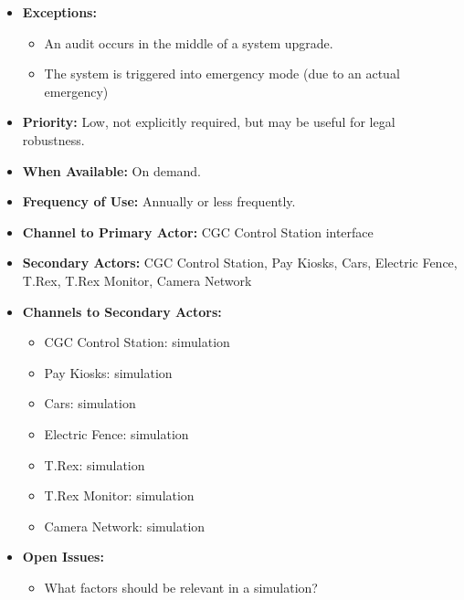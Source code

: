 \documentclass[12pt]{article}
\begin{document}
\begin{itemize}
        \item[]\textbf{Exceptions:}
            \begin{itemize}
                \item[] An audit occurs in the middle of a system upgrade.
                \item[] The system is triggered into emergency mode (due to an actual emergency)
            \end{itemize}

        \item[]\textbf{Priority:}
            Low, not explicitly required, but may be useful for legal robustness.

        \item[]\textbf{When Available:}
            On demand.

        \item[]\textbf{Frequency of Use:}
            Annually or less frequently.

        \item[]\textbf{Channel to Primary Actor:}
            CGC Control Station interface

        \item[]\textbf{Secondary Actors:}
            CGC Control Station, Pay Kiosks, Cars, Electric Fence, T.Rex, 
            T.Rex Monitor, Camera Network
            
        \item[]\textbf{Channels to Secondary Actors:}
            \begin{itemize}
                \item[] CGC Control Station: simulation
                \item[] Pay Kiosks: simulation
                \item[] Cars: simulation
                \item[] Electric Fence: simulation
                \item[] T.Rex: simulation
                \item[] T.Rex Monitor: simulation
                \item[] Camera Network: simulation
            \end{itemize}

        \item[]\textbf{Open Issues:}
            \begin{itemize}
                \item[] What factors should be relevant in a simulation?
            \end{itemize}
    \end{itemize}
\end{document}
